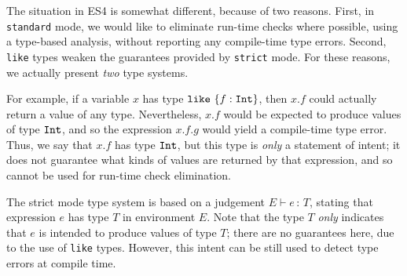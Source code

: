 \documentclass{article}
\newcommand{\judge}[2]{\ensuremath{\Gamma\vdash{#1}:{#2}}}
\newcommand{\comment}[1]{}
\newcommand{\Int}{\t{Int}}
\renewcommand{\t}[1]{{\tt #1}}
\renewcommand{\judge}[3]{#1\vdash #2\,:\,#3}
\newcommand{\objty}[1]{\{#1\}}
\newcommand{\objget}[2]{#1.#2}
\newcommand{\likety}[1]{\t{like}~#1}
\begin{document}
The situation in ES4 is somewhat different, because of two reasons. First, in \t{standard} mode, we would like to eliminate run-time checks where possible, using a type-based analysis,
without reporting any compile-time type errors.
Second, \t{like} types weaken the guarantees provided by \t{strict} mode.
For these reasons, we actually present \emph{two} type systems.

For example, if a variable $x$ has type $\likety{\objty{f:\Int}}$,
then $\objget x f$  could actually return a value of any type.  
Nevertheless, 
$\objget x f$
would be expected to produce values of type $\Int$, and so 
the expression
$\objget{\objget x f} g$ would yield a compile-time type error.
Thus, we say that $\objget x f$ has type $\Int$, but this type is \emph{only} a statement of intent;
it does not guarantee what kinds of values are returned by that expression,
and so cannot be used for run-time check elimination.



The strict mode type system is based on a judgement $\judge{E}{e}{T}$,
stating that expression $e$ has type $T$ in environment $E$.
Note that the type $T$ \emph{only} indicates that $e$ is intended to produce values of type $T$; there are no guarantees here, due to the use of \t{like} types. 
However, this intent can be still used to detect type errors at compile time.

\comment{
Note that the judgement $\judge{E}{e}{T}$ means that $e$ is \emph{expected} to only produce values of type $T$,
and the purpose of the strict mode type system is only to heuristically detect errors at verification time.
The following section presents a type system with stronger guarantees that are sufficient for removing some run-time type checks.
}
\end{document}
